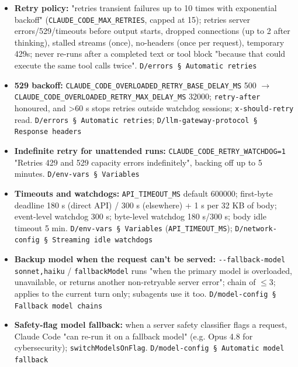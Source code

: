 \begin{itemize}
\item \textbf{Retry policy:} "retries transient failures up to 10 times with exponential backoff" (\texttt{CLAUDE\_\allowbreak{}CODE\_\allowbreak{}MAX\_\allowbreak{}RETRIES}, capped at 15); retries server errors/529/timeouts before output starts, dropped connections (up to 2 after thinking), stalled streams (once), no-headers (once per request), temporary 429s; never re-runs after a completed text or tool block "because that could execute the same tool calls twice". \texttt{D/\allowbreak{}errors § Automatic retries}
\item \textbf{529 backoff:} \texttt{CLAUDE\_\allowbreak{}CODE\_\allowbreak{}OVERLOADED\_\allowbreak{}RETRY\_\allowbreak{}BASE\_\allowbreak{}DELAY\_\allowbreak{}MS} 500 $\rightarrow$ \texttt{CLAUDE\_\allowbreak{}CODE\_\allowbreak{}OVERLOADED\_\allowbreak{}RETRY\_\allowbreak{}MAX\_\allowbreak{}DELAY\_\allowbreak{}MS} 32000; \texttt{retry-\allowbreak{}after} honoured, and >60 s stops retries outside watchdog sessions; \texttt{x-\allowbreak{}should-\allowbreak{}retry} read. \texttt{D/\allowbreak{}errors § Automatic retries}; \texttt{D/\allowbreak{}llm-\allowbreak{}gateway-\allowbreak{}protocol § Response headers}
\item \textbf{Indefinite retry for unattended runs:} \texttt{CLAUDE\_\allowbreak{}CODE\_\allowbreak{}RETRY\_\allowbreak{}WATCHDOG=1} "Retries 429 and 529 capacity errors indefinitely", backing off up to 5 minutes. \texttt{D/\allowbreak{}env-\allowbreak{}vars § Variables}
\item \textbf{Timeouts and watchdogs:} \texttt{API\_\allowbreak{}TIMEOUT\_\allowbreak{}MS} default 600000; first-byte deadline 180 s (direct API) / 300 s (elsewhere) + 1 s per 32 KB of body; event-level watchdog 300 s; byte-level watchdog 180 s/300 s; body idle timeout 5 min. \texttt{D/\allowbreak{}env-\allowbreak{}vars § Variables} (\texttt{API\_\allowbreak{}TIMEOUT\_\allowbreak{}MS}); \texttt{D/\allowbreak{}network-\allowbreak{}config § Streaming idle watchdogs}
\item \textbf{Backup model when the request can't be served:} \texttt{-\allowbreak{}-\allowbreak{}fallback-\allowbreak{}model sonnet,haiku} / \texttt{fallbackModel} runs "when the primary model is overloaded, unavailable, or returns another non-retryable server error"; chain of $\leq$3; applies to the current turn only; subagents use it too. \texttt{D/\allowbreak{}model-\allowbreak{}config § Fallback model chains}
\item \textbf{Safety-flag model fallback:} when a server safety classifier flags a request, Claude Code "can re-run it on a fallback model" (e.g. Opus 4.8 for cybersecurity); \texttt{switchModelsOnFlag}. \texttt{D/\allowbreak{}model-\allowbreak{}config § Automatic model fallback}

\end{itemize}
